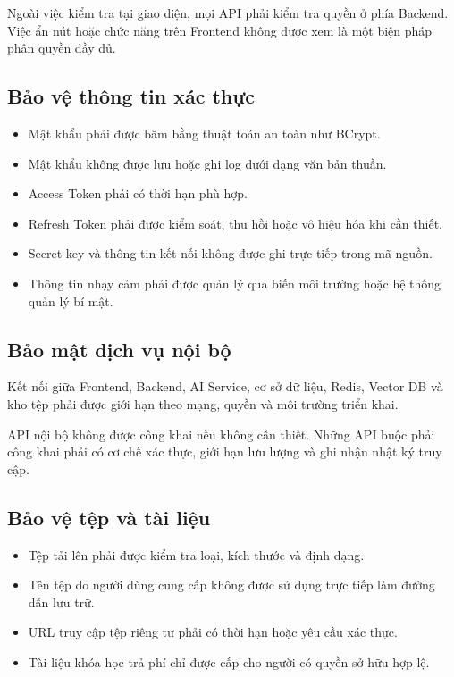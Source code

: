 \documentclass[12pt,a4paper]{article}
\begin{document}
Ngoài việc kiểm tra tại giao diện, mọi API phải kiểm tra quyền ở phía Backend.
Việc ẩn nút hoặc chức năng trên Frontend không được xem là một biện pháp phân quyền đầy đủ.

\subsection{Bảo vệ thông tin xác thực}

\begin{itemize}
    \item Mật khẩu phải được băm bằng thuật toán an toàn như BCrypt.
    \item Mật khẩu không được lưu hoặc ghi log dưới dạng văn bản thuần.
    \item Access Token phải có thời hạn phù hợp.
    \item Refresh Token phải được kiểm soát, thu hồi hoặc vô hiệu hóa khi cần thiết.
    \item Secret key và thông tin kết nối không được ghi trực tiếp trong mã nguồn.
    \item Thông tin nhạy cảm phải được quản lý qua biến môi trường hoặc hệ thống quản lý bí mật.
\end{itemize}

\subsection{Bảo mật dịch vụ nội bộ}

Kết nối giữa Frontend, Backend, AI Service, cơ sở dữ liệu,
Redis, Vector DB và kho tệp phải được giới hạn theo mạng, quyền và môi trường triển khai.

API nội bộ không được công khai nếu không cần thiết. Những API buộc phải công khai
phải có cơ chế xác thực, giới hạn lưu lượng và ghi nhận nhật ký truy cập.

\subsection{Bảo vệ tệp và tài liệu}

\begin{itemize}
    \item Tệp tải lên phải được kiểm tra loại, kích thước và định dạng.
    \item Tên tệp do người dùng cung cấp không được sử dụng trực tiếp làm đường dẫn lưu trữ.
    \item URL truy cập tệp riêng tư phải có thời hạn hoặc yêu cầu xác thực.
    \item Tài liệu khóa học trả phí chỉ được cấp cho người có quyền sở hữu hợp lệ.
\end{itemize}
\end{document}
